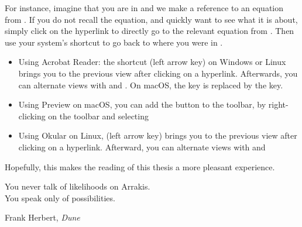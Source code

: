 For instance, imagine that you are in  and we make a reference to an equation from . If you do not recall the equation, and quickly want to see what it is about, simply click on the hyperlink to directly go to the relevant equation from . Then use your system's shortcut to go back to where you were in . 
\begin{itemize}
    \item Using Acrobat Reader: the shortcut \keys{\Altwin + \arrowkeyleft} (left arrow key) on Windows or Linux brings you to the previous view after clicking on a hyperlink. Afterwards, you can alternate views with \keys{\Altwin + \arrowkeyright} and \keys{\Altwin + \arrowkeyleft}. On macOS, the \keys{\Altwin} key is replaced by the \keys{\cmd} key.
    \item Using Preview on macOS, you can add the  button to the toolbar, by right-clicking on the toolbar and selecting 
    \item Using Okular on Linux, \keys{\Altwin + \shift + \arrowkeyleft} (left arrow key) brings you to the previous view after clicking on a hyperlink. Afterward, you can alternate views with \keys{\Altwin + \shift + \arrowkeyright} and \keys{\Altwin + \shift + \arrowkeyleft}
\end{itemize}
Hopefully, this makes the reading of this thesis a more pleasant experience.

\clearpage

\renewcommand{\epigraphsize}{\normalsize}
\setlength{\epigraphrule}{1pt}
\setlength{\epigraphwidth}{0.48\linewidth}
\vspace*{\fill}
\epigraph{You never talk of likelihoods on Arrakis.\\You speak only of possibilities.}{Frank Herbert, \textit{Dune}}
\vspace*{\fill}

\clearpage